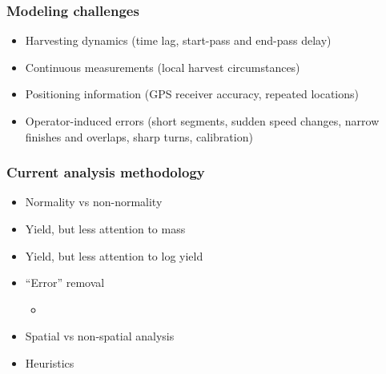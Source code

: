 \documentclass{beamer}
\begin{document}
\begin{frame}
  \frametitle{Modeling challenges}

  \begin{itemize}
  \item Harvesting dynamics (time lag, start-pass and end-pass
    delay)
  \item Continuous measurements (local harvest circumstances)
  \item Positioning information (GPS receiver accuracy, repeated
    locations)
  \item Operator-induced errors (short segments, sudden speed
    changes, narrow finishes and overlaps, sharp turns, calibration)
  \end{itemize}
  

\end{frame}

\begin{frame}
  \frametitle{Current analysis methodology}

  \begin{itemize}
  \item<2-> Normality vs non-normality
  \item<3-> Yield, but less attention to mass
  \item<4-> Yield, but less attention to log yield
  \item<5-> ``Error'' removal
    \begin{itemize}
    \item
    \end{itemize}
  \item<12-> Spatial vs non-spatial analysis
  \item<13-> Heuristics
  \end{itemize}
  
\end{frame}

\end{document}
